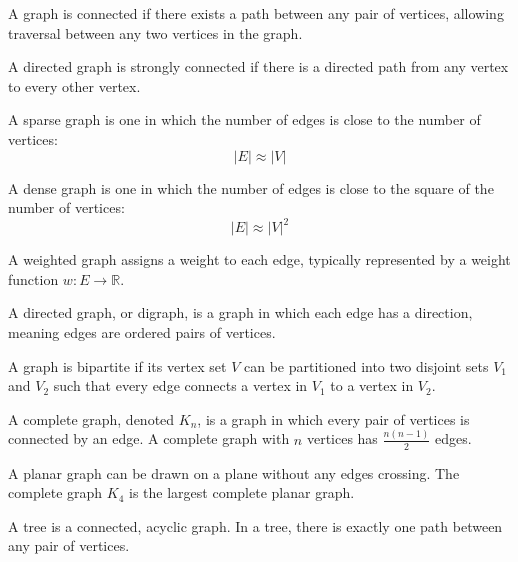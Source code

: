 \begin{definition}
    A graph is connected if there exists a path between any pair of vertices, allowing traversal between any two vertices in the graph.
\end{definition}
\begin{definition}
    A directed graph is strongly connected if there is a directed path from any vertex to every other vertex.
\end{definition}
\begin{definition}
    A sparse graph is one in which the number of edges is close to the number of vertices:
    \[\left\lvert E\right\rvert\approx\left\lvert V\right\rvert \]
\end{definition}
\begin{definition}
    A dense graph is one in which the number of edges is close to the square of the number of vertices:
    \[\left\lvert E\right\rvert\approx{\left\lvert V\right\rvert}^2 \]
\end{definition}
\begin{definition}
    A weighted graph assigns a weight to each edge, typically represented by a weight function $w: E \rightarrow \mathbb{R}$.
\end{definition}
\begin{definition}
    A directed graph, or digraph, is a graph in which each edge has a direction, meaning edges are ordered pairs of vertices.
\end{definition}
\begin{definition}
    A graph is bipartite if its vertex set $V$ can be partitioned into two disjoint sets $V_1$ and $V_2$ such that every edge connects a vertex in $V_1$ to a vertex in $V_2$.
\end{definition}
\begin{definition}
    A complete graph, denoted $K_n$, is a graph in which every pair of vertices is connected by an edge. 
    A complete graph with $n$ vertices has $\frac{n(n-1)}{2}$ edges.
\end{definition}
\begin{definition}
    A planar graph can be drawn on a plane without any edges crossing.
    The complete graph $K_4$ is the largest complete planar graph.
\end{definition}
\begin{definition}
    A tree is a connected, acyclic graph. 
    In a tree, there is exactly one path between any pair of vertices.
\end{definition}

